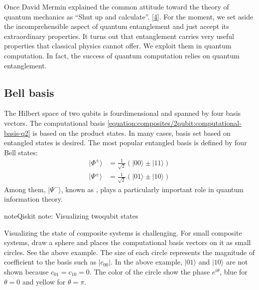 \documentclass[letterpaper,10pt,english]{jupyterBook}
\begin{document}
\sphinxAtStartPar
Once David Mermin explained the common attitude toward the theory of quantum mechanics as “Shut up and calculate”. {[}\hyperlink{cite.references:id19}{4}{]}.   For the moment, we set aside the incomprehensible aspect of quantum entanglement and just accept its extraordinary properties.  It turns out that entanglement carries very useful properties that classical physics cannot offer. We exploit them in quantum computation.  In fact, the success of quantum computation relies on quantum entanglement.


\subsection{Bell basis}
\label{\detokenize{composites/2qubit:bell-basis}}
\sphinxAtStartPar
The Hilbert space of two qubits is four\sphinxhyphen{}dimensional and spanned by four basis vectors.  The computational basis \eqref{equation:composites/2qubit:computational-basis-q2} is based on the product states.  In many cases, basis set based on entangled states is desired.  The most popular entangled basis is  defined by four Bell states:
\begin{align}
|\Phi^{\pm}\rangle &= \frac{1}{\sqrt{2}} \left(|00\rangle \pm |11\rangle\right) \\
|\Psi^{\pm}\rangle &= \frac{1}{\sqrt{2}} \left(|01\rangle \pm |10\rangle\right)
\end{align}
\sphinxAtStartPar
Among them, \(|\Psi^{-}\rangle\), known as , plays a particularly important role in quantum information theory.

\begin{sphinxadmonition}{note}{Qiskit note: Visualizing two\sphinxhyphen{}qubit states}

\sphinxAtStartPar
Visualizing the state of composite systems is challenging.  For small composite systems,  draw a sphere and places the computational basis vectors on it as small circles. See the above example.  The size of each circle represents the magnitude of coefficient to the basis such as \(|c_{00}|\). In the above example, \(|01\rangle\) and \(|10\rangle\) are not shown because \(c_{01}=c_{10}=0\). The color of the circle show the phase \(e^{i \theta}\), blue for \(\theta=0\) and yellow for \(\theta=\pi\).
\end{sphinxadmonition}
\end{document}
